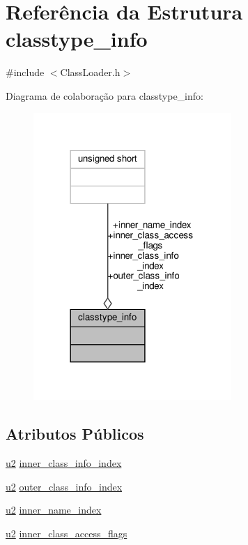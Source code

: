 \hypertarget{structclasstype__info}{}\section{Referência da Estrutura classtype\+\_\+info}
\label{structclasstype__info}


{\ttfamily \#include $<$Class\+Loader.\+h$>$}



Diagrama de colaboração para classtype\+\_\+info\+:
\nopagebreak
\begin{figure}[H]
\begin{center}
\leavevmode
\includegraphics[width=213pt]{structclasstype__info__coll__graph}
\end{center}
\end{figure}
\subsection*{Atributos Públicos}
\begin{DoxyCompactItemize}
\item 
\hyperlink{ClassLoader_8h_a5f223212eef04d10a4550ded680cb1cf}{u2} \hyperlink{structclasstype__info_a3d095ea8d63dca94b9feb3a365b1f52e}{inner\+\_\+class\+\_\+info\+\_\+index}
\item 
\hyperlink{ClassLoader_8h_a5f223212eef04d10a4550ded680cb1cf}{u2} \hyperlink{structclasstype__info_addb19ba72e3ccfc7b7e5630b872e87f1}{outer\+\_\+class\+\_\+info\+\_\+index}
\item 
\hyperlink{ClassLoader_8h_a5f223212eef04d10a4550ded680cb1cf}{u2} \hyperlink{structclasstype__info_a55194f64ad8da0051fd2457811852eda}{inner\+\_\+name\+\_\+index}
\item 
\hyperlink{ClassLoader_8h_a5f223212eef04d10a4550ded680cb1cf}{u2} \hyperlink{structclasstype__info_a2e4834ba45e2650aa080837472e9afc4}{inner\+\_\+class\+\_\+access\+\_\+flags}
\end{DoxyCompactItemize}


